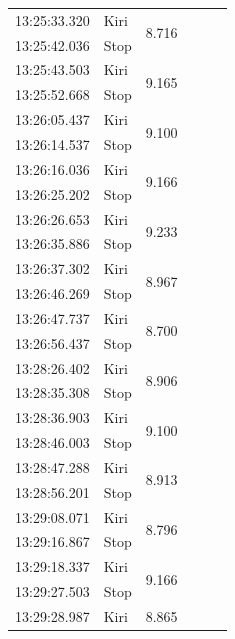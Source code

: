 \begin{longtable}{|l|l|l|l|l|l|}
  \hline
  13:25:33.320 & Kiri & \multirow{2}{*}{8.716}               \\   \cline{1-2}
  13:25:42.036 & Stop &                     \\ \hline
  13:25:43.503 & Kiri & \multirow{2}{*}{9.165}               \\   \cline{1-2}
  13:25:52.668 & Stop &                     \\ \hline
  13:26:05.437 & Kiri & \multirow{2}{*}{9.100}               \\   \cline{1-2}
  13:26:14.537 & Stop &                     \\ \hline
  13:26:16.036 & Kiri & \multirow{2}{*}{9.166}               \\   \cline{1-2}
  13:26:25.202 & Stop &                     \\ \hline
  13:26:26.653 & Kiri & \multirow{2}{*}{9.233}               \\   \cline{1-2}
  13:26:35.886 & Stop &                     \\ \hline
  13:26:37.302 & Kiri & \multirow{2}{*}{8.967}               \\   \cline{1-2}
  13:26:46.269 & Stop &                     \\ \hline
  13:26:47.737 & Kiri & \multirow{2}{*}{8.700}               \\   \cline{1-2}
  13:26:56.437 & Stop &                     \\ \hline
  13:28:26.402 & Kiri & \multirow{2}{*}{8.906}               \\   \cline{1-2}
  13:28:35.308 & Stop &                     \\ \hline
  13:28:36.903 & Kiri & \multirow{2}{*}{9.100}               \\   \cline{1-2}
  13:28:46.003 & Stop &                     \\ \hline
  13:28:47.288 & Kiri & \multirow{2}{*}{8.913}               \\   \cline{1-2}
  13:28:56.201 & Stop &                     \\ \hline
  13:29:08.071 & Kiri & \multirow{2}{*}{8.796}               \\   \cline{1-2}
  13:29:16.867 & Stop &                     \\ \hline
  13:29:18.337 & Kiri & \multirow{2}{*}{9.166}               \\   \cline{1-2}
  13:29:27.503 & Stop &                     \\ \hline
  13:29:28.987 & Kiri & \multirow{2}{*}{8.865}               \\   \cline{1-2}

\end{longtable}
